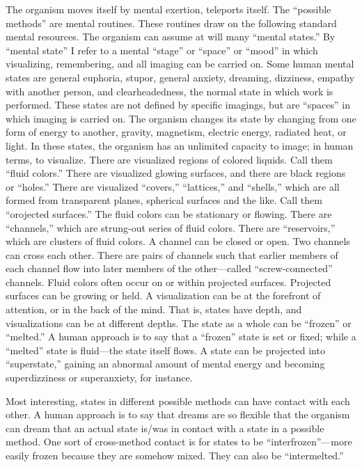 The organism moves itself by mental exertion, teleports itself. The 
\enquote{possible methods} are mental routines. These routines draw on the 
following standard mental resources. The organism can assume at will many 
\enquote{mental states.} By \enquote{mental state} I refer to a mental \enquote{stage} or \enquote{space} or 
\enquote{mood} in which visualizing, remembering, and all imaging can be carried 
on. Some human mental states are general euphoria, stupor, general anxiety, 
dreaming, dizziness, empathy with another person, and clearheadedness, the 
normal state in which work is performed. These states are not defined by 
specific imagings, but are \enquote{spaces} in which imaging is carried on. The 
organism changes its state by changing from one form of energy to another, 
gravity, magnetism, electric energy, radiated heat, or light. In these states, 
the organism has an unlimited capacity to image; in human terms, to 
visualize. There are visualized regions of colored liquids. Call them \enquote{fluid 
colors.} There are visualized glowing surfaces, and there are black regions or 
\enquote{holes.} There are visualized \enquote{covers,} \enquote{lattices,} and \enquote{shells,} which are all 
formed from transparent planes, spherical surfaces and the like. Call them 
\enquote{orojected surfaces.} The fluid colors can be stationary or flowing. There are 
\enquote{channels,} which are strung-out series of fluid colors. There are 
\enquote{reservoirs,} which are clusters of fluid colors. A channel can be closed or 
open. Two channels can cross each other. There are pairs of channels such 
that earlier members of each channel flow into later members of the 
other---called \enquote{screw-connected} channels. Fluid colors often occur on or 
within projected surfaces. Projected surfaces can be growing or held. A 
visualization can be at the forefront of attention, or in the back of the mind. 
That is, states have depth, and visualizations can be at different depths. The 
state as a whole can be \enquote{frozen} or \enquote{melted.} A human approach is to say 
that a \enquote{frozen} state is set or fixed; while a \enquote{melted} state is fluid---the state 
itself flows. A state can be projected into \enquote{superstate,} gaining an abnormal 
amount of mental energy and becoming superdizziness or superanxiety, for 
instance. 

Most interesting, states in different possible methods can have contact 
with each other. A human approach is to say that dreams are so flexible that 
the organism can dream that an actual state is\slash was in contact with a state in 
a possible method. One sort of cross-method contact is for states to be 
\enquote{interfrozen}---more easily frozen because they are somehow mixed. They 
can also be \enquote{intermelted.} 

